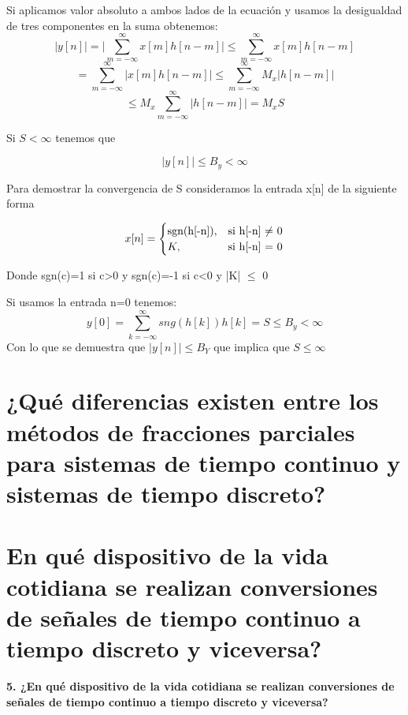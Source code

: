 	Si aplicamos valor absoluto a ambos lados de la ecuación y usamos la desigualdad de tres componentes en la suma obtenemos: 
	\begin{equation}
		\lvert y[n]\rvert = \lvert \sum_{m=-\infty}^{\infty}x[m]h[n-m] \rvert \leq \sum_{m=-\infty}^{\infty}x[m]h[n-m]
	\end{equation}		
	\begin{equation}
		=\sum_{m=-\infty}^{\infty}\lvert x[m]h[n-m] \rvert \leq \sum_{m=-\infty}^{\infty}M_x \lvert h[n-m] \rvert
	\end{equation}
	\begin{equation}
		\leq M_x \sum_{m=-\infty}^{\infty} \lvert h[n-m] \rvert = M_xS
	\end{equation}

	Si $S<\infty$ tenemos que 
	
	\begin{equation}
		|y[n]|\leq B_y < \infty
	\end{equation}
	
	Para demostrar la convergencia de S consideramos la entrada x[n] de la siguiente forma
	
	\[
	x[n]=
	\begin{cases}
		$sgn(h[-n])$, & \text{si h[-n]  $\neq$ 0} \\
		K, & \text{si h[-n] = 0}				\end{cases}
	\]
	
	Donde sgn(c)=1 si c>0 y sgn(c)=-1 si c<0 y |K| $\leq$ 0
	\newline
	
	Si usamos la entrada n=0 tenemos:
	\begin{equation}
		y[0]=\sum_{k=-\infty}^\infty sng(h[k]) h[k] = S \leq B_y < \infty
	\end{equation}
	Con lo que se demuestra que $|y[n]| \leq B_Y$ que implica que $S\leq\infty$

\section{¿Qué diferencias existen entre los métodos de fracciones parciales para sistemas de tiempo continuo y sistemas de tiempo discreto?}
\section{En qué dispositivo de la vida cotidiana se realizan conversiones de señales de tiempo continuo a tiempo discreto y viceversa?}

	\noindent\textbf{5. ¿En qué dispositivo de la vida cotidiana se realizan conversiones de señales de tiempo continuo a tiempo discreto y viceversa?}
	\newline
	
